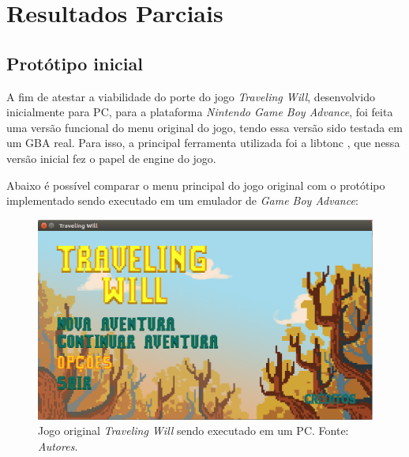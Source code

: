 \chapter[Resultados Parciais]{Resultados Parciais}

\section{Protótipo inicial}

A fim de atestar a viabilidade do porte do jogo \textit{Traveling Will}, desenvolvido inicialmente para PC, para a plataforma \textit{Nintendo Game Boy Advance}, foi feita uma versão funcional do menu original do jogo, tendo essa versão sido testada em um GBA real. Para isso, a principal ferramenta utilizada foi a libtonc \cite{libtonc}, que nessa versão inicial fez o papel de engine do jogo.

Abaixo é possível comparar o menu principal do jogo original com o protótipo implementado sendo executado em um emulador de \textit{Game Boy Advance}:

\begin{figure}[H]
 \centering \includegraphics[keepaspectratio=true,scale=0.6]{figuras/tw-original-1.eps}
   \caption{Jogo original \textit{Traveling Will} sendo executado em um PC. Fonte: \textit{Autores}.}
   \label{tw-original-1}
\end{figure}

